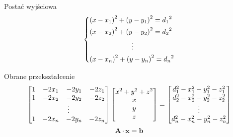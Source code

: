 \begin{frame}
    \begin{block}{Postać wyjściowa}
        \begin{equation*}
            \begin{dcases}
                {(x - x_1)}^2 + {(y - y_1)}^2 = {d_1}^2 \\
                {(x - x_2)}^2 + {(y - y_2)}^2 = {d_2}^2 \\
                \mspace{110mu}\vdots                    \\
                {(x - x_n)}^2 + {(y - y_n)}^2 = {d_n}^2
            \end{dcases}
        \end{equation*}
    \end{block}

    \begin{block}{Obrane przekształcenie}
        \begin{equation*}
            \left[
                \begin{matrix}
                    1 & -2x_1 & -2y_1 & -2z_1  \\
                    1 & -2x_2 & -2y_2 & -2z_2  \\
                    \multicolumn{4}{c}{\vdots} \\
                    1 & -2x_n & -2y_n & -2z_n  \\
                \end{matrix}
                \right]
            \left[
                \begin{matrix}
                    x^2 + y^2 + z^2 \\
                    x               \\
                    y               \\
                    z               \\
                \end{matrix}
                \right]
            =
            \left[
                \begin{matrix}
                    d_1^2 - x_1^2 - y_1^2 - z_1^2 \\
                    d_2^2 - x_2^2 - y_2^2 - z_2^2 \\
                    \vdots                        \\
                    d_n^2 - x_n^2 - y_n^2 - z_n^2 \\
                \end{matrix}
                \right]
        \end{equation*}
        \begin{equation*}
            \mathbf{A} \cdot \mathbf{x} = \mathbf{b}
        \end{equation*}
    \end{block}
\end{frame}